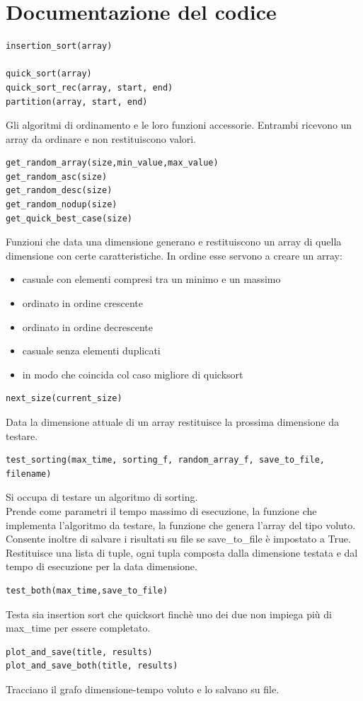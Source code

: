 \documentclass[]{article}
\begin{document}
\section{Documentazione del codice}
\begin{verbatim}
insertion_sort(array)

quick_sort(array)
quick_sort_rec(array, start, end)
partition(array, start, end)
\end{verbatim}
Gli algoritmi di ordinamento e le loro funzioni accessorie. Entrambi ricevono un array da ordinare e non restituiscono valori.
\begin{verbatim}
get_random_array(size,min_value,max_value)
get_random_asc(size)
get_random_desc(size)
get_random_nodup(size)
get_quick_best_case(size)
\end{verbatim}
Funzioni che data una dimensione generano e restituiscono un array di quella dimensione con certe caratteristiche. In ordine esse servono a creare un array:
\begin{itemize}
\item casuale con elementi compresi tra un minimo e un massimo
\item ordinato in ordine crescente
\item ordinato in ordine decrescente
\item casuale senza elementi duplicati
\item in modo che coincida col caso migliore di quicksort
\end{itemize}
\begin{verbatim}
next_size(current_size)
\end{verbatim}
Data la dimensione attuale di un array restituisce la prossima dimensione da testare.
\begin{verbatim}
test_sorting(max_time, sorting_f, random_array_f, save_to_file, filename)
\end{verbatim}
Si occupa di testare un algoritmo di sorting.\\
Prende come parametri il tempo massimo di esecuzione, la funzione che implementa l'algoritmo da testare, la funzione che genera l'array del tipo voluto. Consente inoltre di salvare i risultati su file se save\_to\_file è impostato a True.\\
Restituisce una lista di tuple, ogni tupla  composta dalla dimensione testata e dal tempo di esecuzione per la data dimensione.
\begin{verbatim}
test_both(max_time,save_to_file)
\end{verbatim}
Testa sia insertion sort che quicksort finchè uno dei due non impiega più di max\_time per essere completato.
\begin{verbatim}
plot_and_save(title, results)
plot_and_save_both(title, results)
\end{verbatim}
Tracciano il grafo dimensione-tempo voluto e lo salvano su file.
\end{document}
